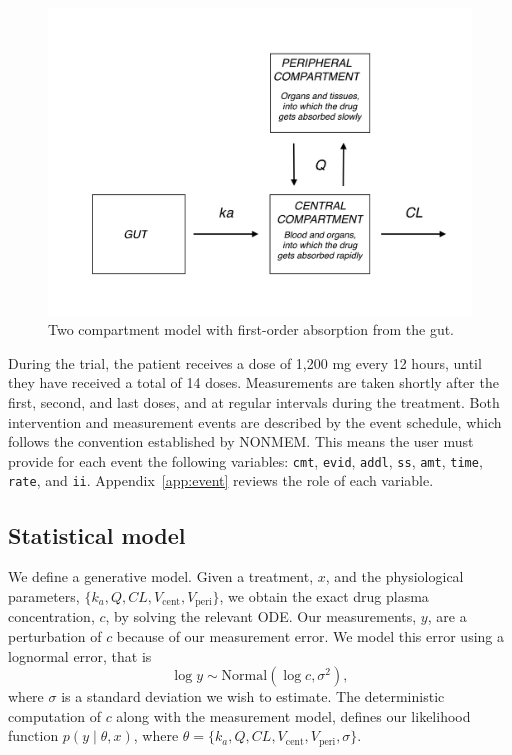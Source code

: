 \begin{figure}
  \begin{center}
  \includegraphics[width=5in]{../figures/TwoCptNice.png}
  \caption{Two compartment model with first-order absorption from the gut.}
  \label{fig:twocpt}
  \end{center}
\end{figure}

During the trial, the patient receives a dose of 1,200 mg every 12 hours, until they have received a total of 14 doses.
Measurements are taken shortly after the first, second, and last doses, and at regular intervals during the treatment.
Both intervention and measurement events are described by the event schedule, which follows the convention established by NONMEM.
This means the user must provide for each event the following variables: \texttt{cmt}, \texttt{evid}, \texttt{addl}, \texttt{ss}, \texttt{amt}, \texttt{time}, \texttt{rate}, and \texttt{ii}.
Appendix~\ref{app:event} reviews the role of each variable.

\subsection{Statistical model}

We define a generative model.
Given a treatment, $x$, and the physiological parameters, $\{ k_a, Q, CL, V_\mathrm{cent}, V_\mathrm{peri} \}$, we obtain the exact drug plasma concentration, $c$, by solving the relevant ODE.
Our measurements, $y$, are a perturbation of $c$ because of our measurement error.
We model this error using a lognormal error, that is
\begin{equation*}
  \log y \sim \mathrm{Normal}(\log c, \sigma^2),
\end{equation*}
where $\sigma$ is a standard deviation we wish to estimate.
The deterministic computation of $c$ along with the measurement model, defines our likelihood function $p(y \mid \theta, x)$, where $\theta = \{ k_a, Q, CL, V_\mathrm{cent}, V_\mathrm{peri}, \sigma \}$.

